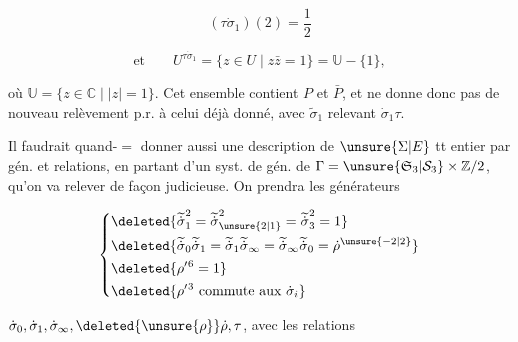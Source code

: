 \[
(\tau\dot\sigma_1)(2)=\frac12
\]

\[
\text{et}\qquad U^{\tau\dot\sigma_1}=\{z\in U\mid z\bar z=1\}=\mathbb U-\{1\},
\]

où $\mathbb U=\{z\in\mathbb C\mid |z|=1\}$. Cet ensemble contient $P$ et $\bar P$, et ne donne donc pas de nouveau relèvement p.r. à celui déjà donné, avec $\widetilde\sigma_1$ relevant $\dot\sigma_1\tau$.

Il faudrait quand-$=$ donner aussi une description de $\unsure{\Sigma|E}$ tt entier par gén. et relations, en partant d'un syst. de gén. de $\Gamma=\unsure{\mathfrak S_3|\mathcal S_3}\times\mathbb Z/2$, qu'on va relever de façon judicieuse. On prendra les  générateurs




\[
\left\{\begin{aligned}
&\deleted{\widetilde{\dot\sigma}_1^2=\widetilde{\dot\sigma}_{\unsure{2|1}}^2=\widetilde{\dot\sigma}_3^2=1}\\
&\deleted{\widetilde{\dot\sigma}_0\widetilde{\dot\sigma}_1=\widetilde{\dot\sigma}_1\widetilde{\dot\sigma}_\infty=\widetilde{\dot\sigma}_\infty\widetilde{\dot\sigma}_0=\dot\rho^{\unsure{-2|2}}}\\
&\deleted{\rho'{}^6=1}\\
&\deleted{\rho'{}^3\ \text{commute aux }\dot\sigma_i}
\end{aligned}\right.
\]


$\dot\sigma_0,\dot\sigma_1,\dot\sigma_\infty,\deleted{\unsure{\rho}}\dot\rho,\tau$, avec les relations

